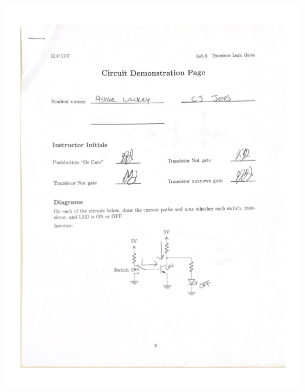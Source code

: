 \documentclass[11pt]{article}
\begin{document}
\begin{center}
	
	\includegraphics[page = 1, width=1.0\textwidth]{"Circuit Demonstration"}
	

\end{center}
\end{document}
